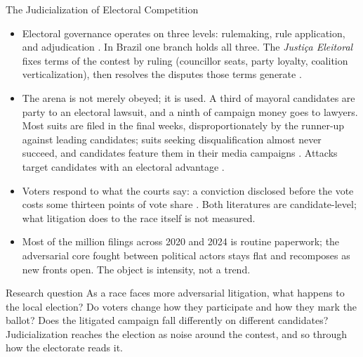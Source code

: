 
\begin{frame}{The Judicialization of Electoral Competition}
\hypertarget{src:motivation}{}
\small
\begin{itemize}\itemsep1pt
  \item Electoral governance operates on three levels: rulemaking, rule application, and adjudication . In Brazil one branch holds all three. The \emph{Justi\c{c}a Eleitoral} fixes terms of the contest by ruling (councillor seats, party loyalty, coalition verticalization), then resolves the disputes those terms generate .\hfill\hyperlink{app:theory}{}

  \item The arena is not merely obeyed; it is used. A third of mayoral candidates are party to an electoral lawsuit, and a ninth of campaign money goes to lawyers. Most suits are filed in the final weeks, disproportionately by the runner-up against leading candidates; suits seeking disqualification almost never succeed, and candidates feature them in their media campaigns . Attacks target candidates with an electoral advantage .

  \item Voters respond to what the courts say: a conviction disclosed before the vote costs some thirteen points of vote share . Both literatures are candidate-level; what litigation does to the race itself is not measured.

  \item Most of the \TotalAllLawsuits{} million filings across 2020 and 2024 is routine paperwork; the \textcolor{myblue}{adversarial core} fought between political actors stays flat and recomposes as new fronts open. The object is \textcolor{myblue}{intensity}, not a trend.\hfill\hyperlink{app:recomp}{}\,\hyperlink{app:timeline}{}
\end{itemize}
\vspace{-2pt}
\begin{block}{Research question}
\footnotesize As a race faces more adversarial litigation, what happens to the local election? Do voters change how they participate and how they mark the ballot? Does the litigated campaign fall differently on different candidates? Judicialization reaches the election as noise around the contest, and so through how the electorate reads it.
\end{block}
\end{frame}
